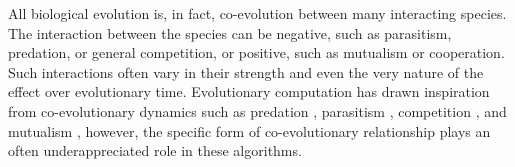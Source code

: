 









All biological evolution is, in fact, co-evolution between many interacting species.
The interaction between the species can be negative, such as parasitism, predation, or general competition, or positive, such as mutualism or cooperation.
Such interactions often vary in their strength and even the very nature of the effect over evolutionary time.
Evolutionary computation has drawn inspiration from co-evolutionary dynamics such as predation \citep{willkens2022evolving,popovici2012coevolutionary, ficici2000gametheoretic}, parasitism \citep{hillis1990coevolving,  cliff1995tracking}, competition \citep{stanley2004competitive}, and mutualism \citep{wang2019paired, bucci2005identifying, bucci2003mathematical, bucci2003focusing, watson2003computational, watson2001coevolutionary}, however, the specific form of co-evolutionary relationship plays an often underappreciated role in these algorithms.

